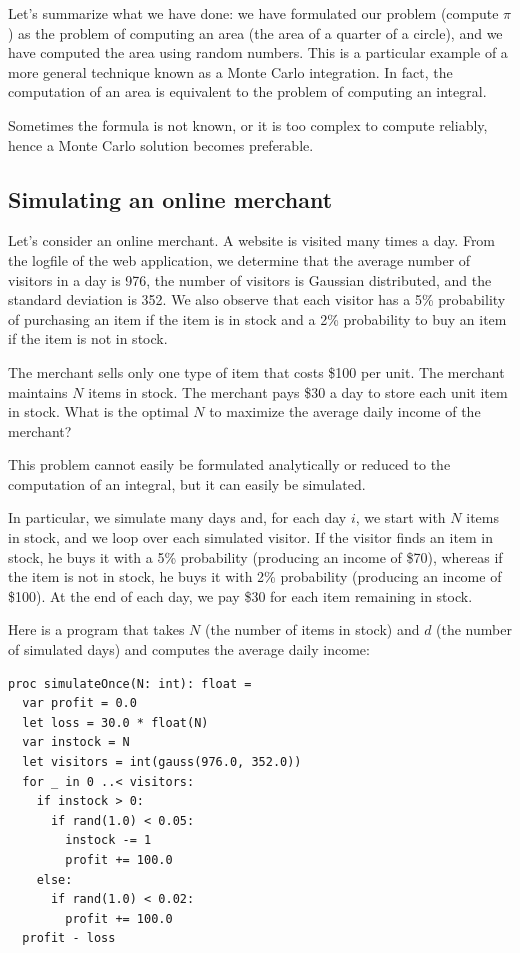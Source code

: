 \documentclass[justified, sixbynine]{tufte-book}
\theoremstyle{plain}%
\newtheorem * {corollary}{Corollary}
\theoremstyle{definition}
\theoremstyle{remark}
\newtheorem * {remark}{Remark}
\newtheorem * {note}{Note}
\begin{document}
\begin{fullwidth}
Let's summarize what we have done: we have formulated our problem (compute $%
\pi $) as the problem of computing an area (the area of a quarter of a
circle), and we have computed the area using random numbers. This is a
particular example of a more general technique known as a Monte Carlo
integration. In fact, the computation of an area is equivalent to the problem
of computing an integral.

Sometimes the formula is not known, or it is too complex to compute reliably, hence a Monte Carlo solution becomes preferable.

\goodbreak\subsection{Simulating an online merchant}

Let's consider an online merchant. A website is visited many times a day.
From the logfile of the web application, we determine
that the average number of visitors in a day is 976, the number of
visitors is Gaussian distributed, and the standard deviation is 352. We also observe that each visitor has a 5\% probability of purchasing an item
if the item is in stock and a 2\% probability to buy an item if the
item is not in stock.

The merchant sells only one type of item that costs \$100 per unit. The
merchant maintains $N$ items in stock. The merchant pays \$30 a day to store
each unit item in stock. What is the optimal $N$ to maximize the average
daily income of the merchant?

This problem cannot easily be formulated analytically or reduced to
the computation of an integral, but it can easily be simulated.

In particular, we simulate many days and, for each day $i$,
we start with $N$ items
in stock, and we loop over each simulated visitor. If the visitor
finds an item in stock, he buys it with a 5\% probability
(producing an income of \$70), whereas if the item is not in stock,
 he buys it with 2\% probability (producing an income of \$100).
At the end of each day, we pay \$30 for each item remaining in stock.

Here is a program that takes $N$ (the number of items in stock) and $d$ (the
number of simulated days) and computes the average daily income:
\begin{lstlisting}
proc simulateOnce(N: int): float =
  var profit = 0.0
  let loss = 30.0 * float(N)
  var instock = N
  let visitors = int(gauss(976.0, 352.0))
  for _ in 0 ..< visitors:
    if instock > 0:
      if rand(1.0) < 0.05:
        instock -= 1
        profit += 100.0
    else:
      if rand(1.0) < 0.02:
        profit += 100.0
  profit - loss


\end{lstlisting}
\end{fullwidth}
\end{document}
